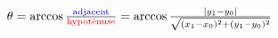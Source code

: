 \documentclass[tikz,convert={outfile=\jobname.svg}]{standalone}
\begin{document}
$\theta = \arccos \frac{\text{\color{blue}{adjacent}}}{\text{\color{red}{hypoténuse}}} = \arccos \frac{| y_1-y_0|}{\sqrt{(x_1-x_0)^2 + (y_1-y_0)^2} }$
\end{document}
